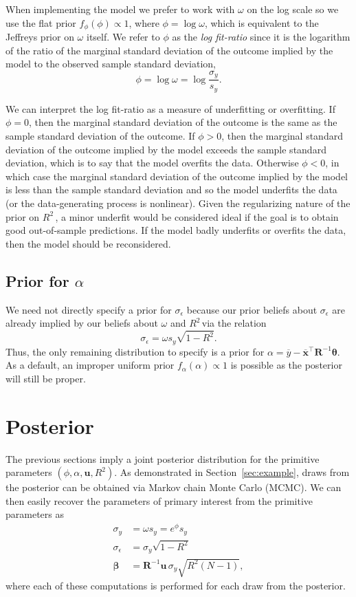 \documentclass[11pt]{article}
\newcommand{\Rsq}{$R^2\,$}
\newcommand{\boldbeta}{\boldsymbol{\beta}}
\newcommand{\boldtheta}{\boldsymbol{\theta}}
\newcommand{\sigmaEps}{\sigma_{\epsilon}}
\newcommand{\R}{\mathbf{R}}
\renewcommand{\u}{\mathbf{u}}
\begin{document}
When implementing the model we prefer to work with $\omega$ on the log scale
so we use the flat prior $f_\phi(\phi) \propto 1$, where $\phi =
\log{\omega}$, which is equivalent to the Jeffreys prior on $\omega$ itself. We
refer to $\phi$ as the \emph{log fit-ratio} since it is the logarithm of the
ratio of the marginal standard deviation of the outcome implied by the model to
the observed sample standard deviation,
%
$$\phi = \log{\omega} = \log{\frac{\sigma_y}{s_y}}.$$

We can interpret the log fit-ratio as a measure of underfitting or overfitting.
If $\phi = 0$, then the marginal standard deviation of the outcome is the same
as the sample standard deviation of the outcome. If $\phi > 0$, then the
marginal standard deviation of the outcome implied by the model exceeds the
sample standard deviation, which is to say that the model overfits the data.
Otherwise $\phi < 0$, in which case the marginal standard deviation of the
outcome implied by the model is less than the sample standard deviation and so
the model underfits the data (or the data-generating process is nonlinear).
Given the regularizing nature of the prior on \Rsq, a minor underfit would be
considered ideal if the goal is to obtain good out-of-sample predictions. If the
model badly underfits or overfits the data, then the model should be
reconsidered.

\subsection{Prior for $\alpha$}
We need not directly specify a prior for $\sigmaEps$ because our prior beliefs
about $\sigmaEps$ are already implied by our beliefs about $\omega$ and \Rsq via
the relation
$$\sigmaEps = \omega s_y \sqrt{1 - R^2}.$$
Thus, the only remaining distribution to specify is a prior for
$\alpha = \overline{y} - \overline{\mathbf{x}}^\top \R^{-1} \boldtheta$.
As a default, an improper uniform prior $f_\alpha(\alpha) \propto 1$ is possible
as the posterior will still be proper.

\section{Posterior}
\label{sec:posterior}

The previous sections imply a joint posterior distribution for the primitive
parameters $\left(\phi, \alpha, \u, R^2 \right)$. As demonstrated in
Section~\ref{sec:example}, draws from the posterior can be obtained via Markov
chain Monte Carlo (MCMC). We can then easily recover the parameters of primary
interest from the primitive parameters as
%
\begin{align*}
\sigma_y &= \omega s_y = e^\phi s_y \\
\sigmaEps &= \sigma_y \sqrt{1 - R^2} \\
\boldbeta &= \R^{-1} \u \, \sigma_y \sqrt{R^2 \left(N-1\right)},
\end{align*}
%
where each of these computations is performed for each draw from the posterior.
\end{document}
